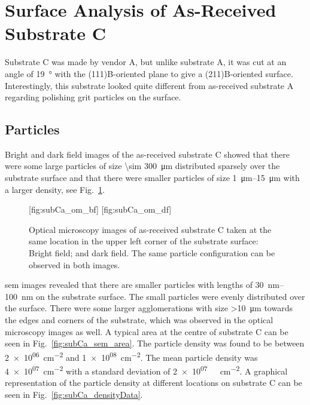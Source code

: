 \clearpage
\section{Surface Analysis of As-Received Substrate C}\label{sec:subCa}
Substrate C was made by vendor A, but unlike substrate A, it was cut at an angle of \SI{19}{\degree} with the (111)B-oriented plane to give a (211)B-oriented surface. Interestingly, this substrate looked quite different from as-received substrate A regarding polishing grit particles on the surface.

\subsection{Particles}
Bright and dark field images of the as-received substrate C showed that there were some large particles of size \SI{\sim 300}{\micro\metre} distributed sparsely over the substrate surface and that there were smaller particles of size \SIrange{1}{15}{\micro\metre} with a larger density, see Fig.~\ref{fig:subCa_om}. %

\begin{figure}[htbp]
    \centering
    [fig:subCa_om_bf]
    \hfill
    [fig:subCa_om_df]
    \caption[Bright and dark field optical microscopy images of as-received substrate C.]{Optical microscopy images of as-received substrate C taken at the same location in the upper left corner of the substrate surface:  Bright field; and  dark field. The same particle configuration can be observed in both images.}
    \label{fig:subCa_om}
\end{figure}

\Ac{sem} images revealed that there are smaller particles with lengths of \SIrange{30}{100}{\nano\metre} on the substrate surface. The small particles were evenly distributed over the surface. There were some larger agglomerations with size \SI{>10}{\micro\metre} towards the edges and corners of the substrate, which was observed in the optical microscopy images as well. A typical area at the centre of substrate C can be seen in Fig.~\ref{fig:subCa_sem_area}. The particle density was found to be between \SI{2e+06}{\centi\metre^{-2}} and \SI{1e+08}{\centi\metre^{-2}}. The mean particle density was \SI{4e+07}{\centi\metre^{-2}} with a standard deviation of \SI{2e+07}{\
\centi\metre^{-2}}. A graphical representation of the particle density at different locations on substrate C can be seen in Fig.~\ref{fig:subCa_densityData}.

